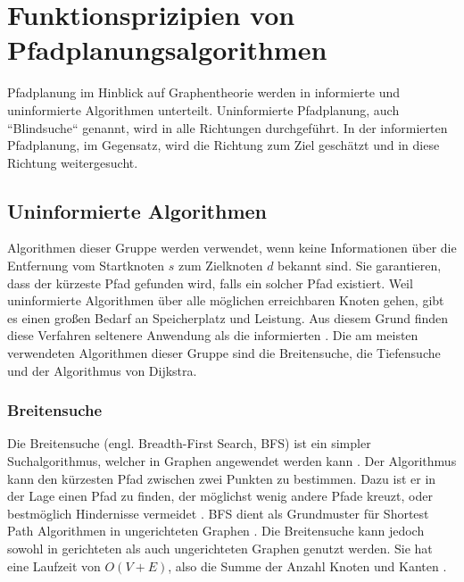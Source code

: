 
\chapter{Funktionsprizipien von Pfadplanungsalgorithmen}

Pfadplanung im Hinblick auf Graphentheorie werden in informierte und uninformierte Algorithmen unterteilt. Uninformierte Pfadplanung, auch ``Blindsuche`` genannt, wird in alle Richtungen durchgeführt. In der informierten Pfadplanung, im Gegensatz, wird die Richtung zum Ziel geschätzt und in diese Richtung weitergesucht\cite{comAnal}. %

\section{Uninformierte Algorithmen}
Algorithmen dieser Gruppe werden verwendet, wenn keine Informationen über die Entfernung vom Startknoten $s$ zum Zielknoten $d$ bekannt sind.
Sie garantieren, dass der kürzeste Pfad gefunden wird, falls ein solcher Pfad existiert\cite{comAnal}. Weil uninformierte Algorithmen über alle möglichen erreichbaren Knoten gehen, gibt es einen großen Bedarf an Speicherplatz und Leistung. Aus diesem Grund finden diese Verfahren seltenere Anwendung als die informierten \cite{sim}. Die am meisten verwendeten Algorithmen dieser Gruppe sind die Breitensuche, die Tiefensuche und der Algorithmus von Dijkstra.

\subsection{Breitensuche}

Die Breitensuche (engl. Breadth-First Search, BFS) ist ein simpler Suchalgorithmus, welcher in Graphen angewendet werden kann \cite{Cormen.2009}. Der Algorithmus kann den kürzesten Pfad zwischen zwei Punkten zu bestimmen. Dazu ist er in der Lage einen Pfad zu finden, der möglichst wenig andere Pfade kreuzt, oder bestmöglich Hindernisse vermeidet \cite{Lee.1961}. BFS dient als Grundmuster für Shortest Path Algorithmen in ungerichteten Graphen \cite{Ottmann.2017}. Die Breitensuche kann jedoch sowohl in gerichteten als auch ungerichteten Graphen genutzt werden. Sie hat eine Laufzeit von $O(V + E)$, also die Summe der Anzahl Knoten und Kanten \cite{Cormen.2009}.

